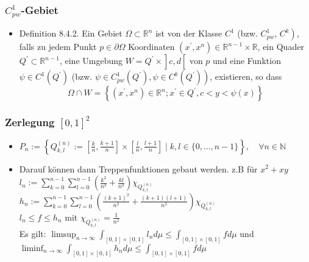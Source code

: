 \documentclass[a3paper, 11pt, landscape]{scrartcl}
\begin{document}
\begin{multicols*}{3}
	\subsubsection{$C^1_{pw}$-Gebiet}
	\begin{itemize}
	    \item Definition 8.4.2. Ein Gebiet \(\Omega \subset \mathbb{R}^{n}\) ist von der Klasse \(C^{1}\) (bzw. \(C_{p w}^{1}\),  \(\left.C^{k}\right)\), falls zu jedem Punkt \(p \in \partial \Omega\) Koordinaten \(\left(x^{\prime}, x^{n}\right) \in \mathbb{R}^{n-1} \times \mathbb{R}\), ein Quader \(Q^{\prime} \subset \mathbb{R}^{n-1}\), eine Umgebung \(\left.W=Q^{\prime} \times\right] c, d\left[\right.\) von \(p\) und eine Funktion \(\psi \in C^{1}\left(Q^{\prime}\right)\)
(bzw. \(\left.\psi \in C_{p w}^{1}\left(Q^{\prime}\right), \psi \in C^{k}\left(Q^{\prime}\right)\right)\), existieren, so dass
$$
\Omega \cap W=\left\{\left(x^{\prime}, x^{n}\right) \in \mathbb{R}^{n} ; x^{\prime} \in Q^{\prime}, c<y<\psi(x)\right\} 
$$
	\end{itemize}

    \subsubsection{Zerlegung $[0,1]^2$}
    \begin{itemize}
        \item $P_{n}:=\left\{Q_{k, l}^{(n)}:=\left[\frac{k}{n}, \frac{k+1}{n}\right] \times\left[\frac{l}{n}, \frac{l+1}{n}\right] \mid k, l \in\{0, \ldots, n-1\}\right\}, \quad \forall n \in \mathbb{N}$
        \item Darauf können dann Treppenfunktionen gebaut werden. z.B für $x^2 + xy$\\
        \(l_{n}:=\sum_{k=0}^{n-1} \sum_{l=0}^{n-1}\left(\frac{k^{2}}{n^{2}}+\frac{k l}{n^{2}}\right) \chi_{Q_{k, l}^{(n)}}\)\\
        \(h_{n}:=\sum_{k=0}^{n-1} \sum_{l=0}^{n-1}\left(\frac{(k+1)^{2}}{n^{2}}+\frac{(k+1)(l+1)}{n^{2}}\right) \chi_{Q_{k, l}^{(n)}}\) \\
        $l_n \leq f \leq h_n$ mit $\chi_{Q_{k, l}^{(n)}}=\frac{1}{n^2}$\\
        Es gilt: \(\limsup _{n \rightarrow \infty} \int_{[0,1] \times[0,1]} l_{n} d \mu \leq \int_{[0,1] \times[0,1]} f d \mu\) und \(\liminf _{n \rightarrow \infty} \int_{[0,1] \times[0,1]} h_{n} d \mu \leq \int_{[0,1] \times[0,1]} f d \mu\)
        
    \end{itemize}
	

\end{multicols*}
\end{document}
